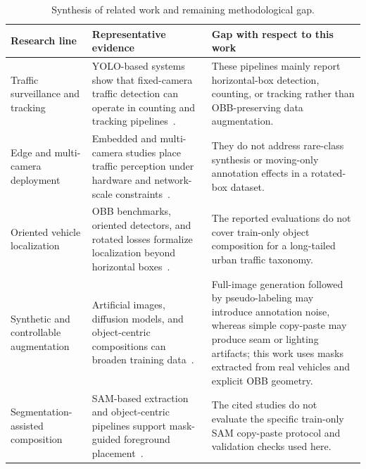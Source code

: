\begin{table}[!t]
  \caption{Synthesis of related work and remaining methodological gap.}
  \label{tab:related_work_summary}
  \centering
  \small
  \begin{tabular}{p{} p{} p{}}
    \toprule
    \textbf{Research line} & \textbf{Representative evidence} & \textbf{Gap with respect to this work} \\
    \midrule
    Traffic surveillance and tracking &
    YOLO-based systems show that fixed-camera traffic detection can operate in counting and tracking pipelines~\cite{Gomaa2022,Kumar2023,BinZuraimi2021}. &
    These pipelines mainly report horizontal-box detection, counting, or tracking rather than OBB-preserving data augmentation. \\
    \midrule
    Edge and multi-camera deployment &
    Embedded and multi-camera studies place traffic perception under hardware and network-scale constraints~\cite{Balamuralidhar2021,Alas2026}. &
    They do not address rare-class synthesis or moving-only annotation effects in a rotated-box dataset. \\
    \midrule
    Oriented vehicle localization &
    OBB benchmarks, oriented detectors, and rotated losses formalize localization beyond horizontal boxes~\cite{Ding2022DOTA,Xie2021OrientedRCNN,Han2021ReDet,Yang2021KLD,Wang2025OBBSurvey}. &
    The reported evaluations do not cover train-only object composition for a long-tailed urban traffic taxonomy. \\
    \midrule
    Synthetic and controllable augmentation &
    Artificial images, diffusion models, and object-centric compositions can broaden training data~\cite{Weber2021ArtificialImagesVehicleDetection,Mumuni2024,Alimisis2025Advances,HuangW2025}. &
    Full-image generation followed by pseudo-labeling may introduce annotation noise, whereas simple copy-paste may produce seam or lighting artifacts; this work uses masks extracted from real vehicles and explicit OBB geometry. \\
    \midrule
    Segmentation-assisted composition &
    SAM-based extraction and object-centric pipelines support mask-guided foreground placement~\cite{Rahat2024,Ahmed2025}. &
    The cited studies do not evaluate the specific train-only SAM copy-paste protocol and validation checks used here. \\
    \bottomrule
  \end{tabular}
\end{table}
